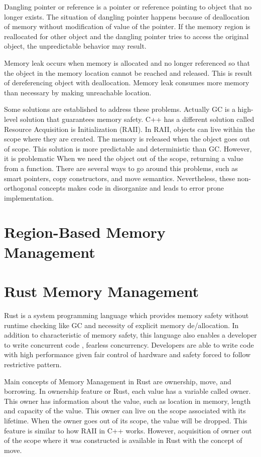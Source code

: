 Dangling pointer or reference is a pointer or reference pointing to object that no longer exists. The situation of dangling pointer happens 
because of deallocation of memory without modification of value of the pointer. 
If the memory region is reallocated for other object and the dangling pointer tries to access the original object, the unpredictable behavior may result. 

Memory leak occurs when memory is allocated and no longer referenced so that the object in the memory location cannot be reached and released.
This is result of dereferencing object with deallocation. Memory leak consumes more memory than necessary by making unreachable location.

Some solutions are established to address these problems. Actually GC is a high-level solution that guarantees memory safety. 
C++ has a different solution called Resource Acquisition is Initialization (RAII). In RAII, objects can live within the scope where they are created. 
The memory is released when the object goes out of scope. This solution is more predictable and deterministic than GC. 
However, it is problematic When we need the object out of the scope, returning a value from a function. 
There are several ways to go around this problems, such as smart pointers, copy constructors, and move semantics. 
Nevertheless, these non-orthogonal concepts makes code in disorganize and leads to error prone implementation. 

\section{Region-Based Memory Management}
\label{sec:history}

\section{Rust Memory Management}
\label{sec:history}
Rust is a system programming language which provides memory safety without runtime checking like GC and necessity of explicit memory de/allocation. 
In addition to characteristic of memory safety, this language also enables a developer to write concurrent code , fearless concurrency. 
Developers are able to write code with high performance given fair control of hardware and safety forced to follow restrictive pattern.

Main concepts of Memory Management in Rust are ownership, move, and borrowing. In ownership feature or Rust, each value has a variable called owner.
This owner has information about the value, such as location in memory, length and capacity of the value. This owner can live on the scope associated with its lifetime.
When the owner goes out of its scope, the value will be dropped. This feature is similar to how RAII in C++ works. 
However, acquisition of owner out of the scope where it was constructed is available in Rust with the concept of move. 

